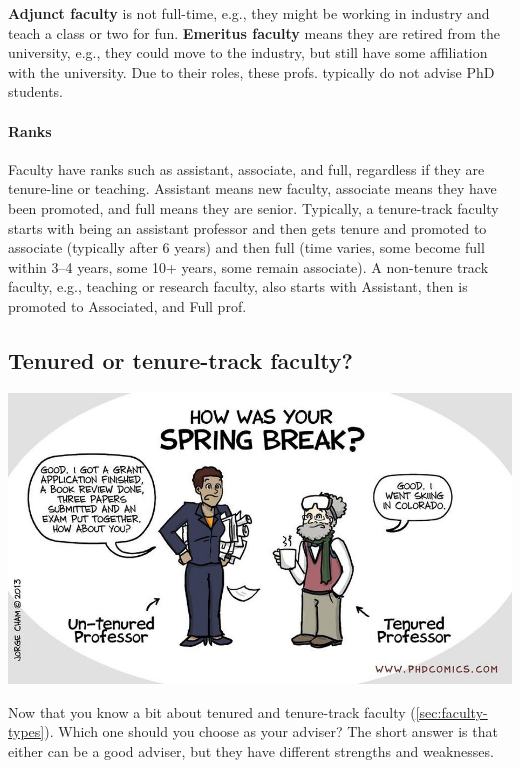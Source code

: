 \documentclass[oneside,11pt,dvipsnames]{book}
\begin{document}
\textbf{Adjunct faculty} is not full-time, e.g., they might be working in industry and teach a class or two for fun. \textbf{Emeritus faculty} means they are retired from the university, e.g., they could move to the industry, but still have some affiliation with the university.   Due to their roles, these profs. typically do not advise PhD students.


\paragraph{Ranks} Faculty have ranks such as assistant, associate, and full, regardless if they are tenure-line or teaching.  Assistant means new faculty, associate means they have been promoted, and full means they are senior. Typically, a tenure-track faculty starts with being an assistant professor and then gets tenure and promoted to associate (typically after 6 years) and then full (time varies, some become full within 3--4 years, some 10+ years, some remain associate). A non-tenure track faculty, e.g., teaching or research faculty, also starts with Assistant, then is promoted to Associated, and Full prof.




\subsection{Tenured or tenure-track faculty?}\label{sec:tenure-vs-tenure-track}

\begin{center}
  \includegraphics[scale=0.4]{files/c8.png}
\end{center}

Now that you know a bit about tenured and tenure-track faculty (\autoref{sec:faculty-types}).  Which one should you choose as your adviser? The short answer is that either can be a good adviser, but they have different strengths and weaknesses.
\end{document}
